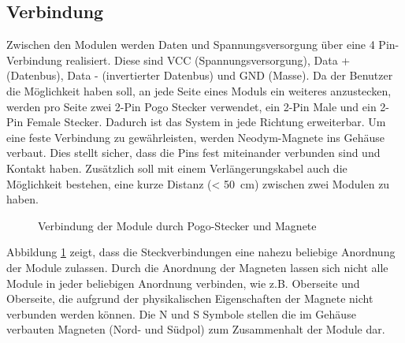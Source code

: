 \subsection{Verbindung}
Zwischen den Modulen werden Daten und Spannungsversorgung über eine 4 Pin-Verbindung realisiert. Diese sind VCC (Spannungsversorgung), Data + (Datenbus), Data - (invertierter Datenbus) und GND (Masse). Da der Benutzer die Möglichkeit haben soll, an jede Seite eines Moduls ein weiteres anzustecken, werden pro Seite zwei 2-Pin Pogo Stecker verwendet, ein 2-Pin Male und ein 2-Pin Female Stecker. Dadurch ist das System in jede Richtung erweiterbar. Um eine feste Verbindung zu gewährleisten,  werden Neodym-Magnete ins Gehäuse verbaut. Dies stellt sicher, dass die Pins fest miteinander verbunden sind und Kontakt haben. Zusätzlich soll mit einem Verlängerungskabel auch die Möglichkeit bestehen, eine kurze Distanz (< 50 cm) zwischen zwei Modulen zu haben. 
\begin{figure}[H]
    \centering    
    \caption{Verbindung der Module durch Pogo-Stecker und Magnete}
    \label{pogo_verbindung}
\end{figure}
 \noindent Abbildung \ref{pogo_verbindung} zeigt, dass die Steckverbindungen eine nahezu beliebige Anordnung der Module zulassen. Durch die Anordnung der Magneten lassen sich nicht alle Module in jeder beliebigen Anordnung verbinden, wie z.B. Oberseite und Oberseite, die aufgrund der physikalischen Eigenschaften der Magnete nicht verbunden werden können. Die \glqq N\grqq{} und \glqq S\grqq{} Symbole stellen die im Gehäuse verbauten Magneten (Nord- und Südpol) zum Zusammenhalt der Module dar.
 
